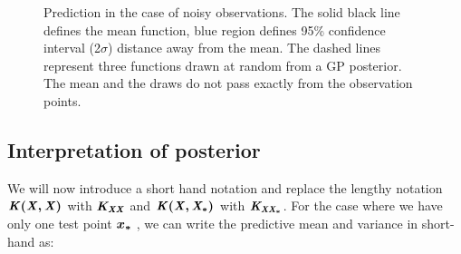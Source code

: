 \begin{figure}[!ht]
  \centering
    \quad
{}\quad
  
       \caption{Prediction in the case of noisy observations. The solid black line defines the mean function, blue region defines 95\% confidence interval (2$\sigma$) distance away from the mean. The dashed lines represent three functions drawn at random from a GP posterior. The mean and the draws do not pass exactly from the observation points.}
       \label{figGPNoisyPosteriors}
\end{figure}

\subsection{Interpretation of posterior}
We will now introduce a short hand notation and replace the lengthy notation $\bm{\mathit{K(X, X)}}$ with $\bm{\mathit{K_{XX}}}$ and $\bm{\mathit{K(X, X_{*})}}$ with $\bm{\mathit{K_{XX_{*}}}}$. For the case where we have only one test point $\boldsymbol{x_{*}}$ , we can write the predictive mean and variance in short-hand as:

